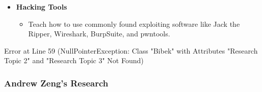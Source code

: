 \documentclass[
  letterpaper,
  DIV=11,
  numbers=noendperiod]{scrartcl}
\newenvironment{Shaded}{\begin{snugshade}}{\end{snugshade}}
\newcommand{\BuiltInTok}[1]{\textcolor[rgb]{0.00,0.23,0.31}{#1}}
\newcommand{\DecValTok}[1]{\textcolor[rgb]{0.68,0.00,0.00}{#1}}
\newcommand{\NormalTok}[1]{\textcolor[rgb]{0.00,0.23,0.31}{#1}}
\newcommand{\OperatorTok}[1]{\textcolor[rgb]{0.37,0.37,0.37}{#1}}
\newcommand{\StringTok}[1]{\textcolor[rgb]{0.13,0.47,0.30}{#1}}
\providecommand{\tightlist}{%
  \setlength{\itemsep}{0pt}\setlength{\parskip}{0pt}}\usepackage{longtable,booktabs,array}
\begin{document}
\begin{itemize}
\tightlist
\item
  \textbf{Hacking Tools}

  \begin{itemize}
  \tightlist
  \item
    Teach how to use commonly found exploiting software like Jack the
    Ripper, Wireshark, BurpSuite, and pwntools.
  \end{itemize}
\end{itemize}

\begin{Shaded}
\begin{Highlighting}[numbers=left,,]
\BuiltInTok{Error}\NormalTok{ at }\BuiltInTok{Line} \DecValTok{59} \OperatorTok{(}\BuiltInTok{NullPointerException}\OperatorTok{:} \BuiltInTok{Class} \StringTok{"Bibek"}\NormalTok{ with }\BuiltInTok{Attributes} \StringTok{"Research Topic 2"}\NormalTok{ and }\StringTok{"Research Topic 3"}\NormalTok{ Not Found}\OperatorTok{)}
\end{Highlighting}
\end{Shaded}

\hypertarget{andrew-zengs-research}{%
\subsubsection{Andrew Zeng's Research}\label{andrew-zengs-research}}
\end{document}
